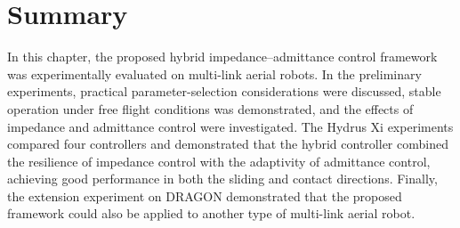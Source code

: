\section{Summary}
In this chapter, the proposed hybrid impedance--admittance control framework was experimentally evaluated on multi-link aerial robots. In the preliminary experiments, practical parameter-selection considerations were discussed, stable operation under free flight conditions was demonstrated, and the effects of impedance and admittance control were investigated. The Hydrus Xi experiments compared four controllers and demonstrated that the hybrid controller combined the resilience of impedance control with the adaptivity of admittance control, achieving good performance in both the sliding and contact directions. Finally, the extension experiment on DRAGON demonstrated that the proposed framework could also be applied to another type of multi-link aerial robot.
